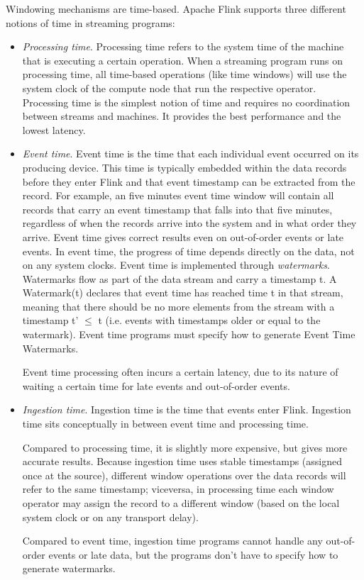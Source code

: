 Windowing mechanisms are time-based. Apache Flink supports three different notions of time in streaming programs:
\begin{itemize}
\item \emph{Processing time}. Processing time refers to the system time of the machine that is executing a certain operation. When a streaming program runs on processing time, all time-based operations (like time windows) will use the system clock of the compute node that run the respective operator. Processing time is the simplest notion of time and requires no coordination between streams and machines. It provides the best performance and the lowest latency. 
\item \emph{Event time}. Event time is the time that each individual event occurred on its producing device. This time is typically embedded within the data records before they enter Flink and that event timestamp can be extracted from the record. For example, an five minutes event time window will contain all records that carry an event timestamp that falls into that five minutes, regardless of when the records arrive into the system and in what order they arrive. Event time gives correct results even on out-of-order events or  late events. In event time, the progress of time depends directly on the data, not on any system clocks. Event time is implemented through \emph{watermarks}. Watermarks flow as part of the data stream and carry a timestamp t. A Watermark(t) declares that event time has reached time t in that stream, meaning that there should be no more elements from the stream with a timestamp t' $\leq$ t (i.e. events with timestamps older or equal to the watermark). Event time programs must specify how to generate Event Time Watermarks.

Event time processing often incurs a certain latency, due to its nature of waiting a certain time for late events and out-of-order events. 
\item \emph{Ingestion time}. Ingestion time is the time that events enter Flink. Ingestion time sits conceptually in between event time and processing time. 

Compared to processing time, it is slightly more expensive, but gives more accurate results. Because ingestion time uses stable timestamps (assigned once at the source), different window operations over the data records will refer to the same timestamp; viceversa, in processing time each window operator may assign the record to a different window (based on the local system clock or on any transport delay).

Compared to event time, ingestion time programs cannot handle any out-of-order events or late data, but the programs don’t have to specify how to generate watermarks.
\end{itemize}
